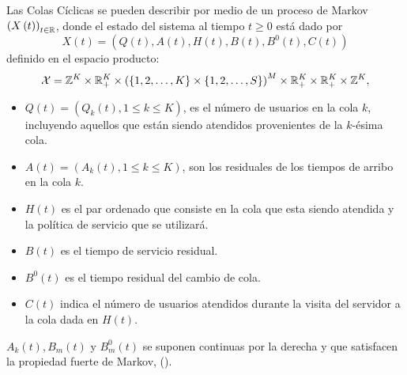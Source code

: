 Las Colas C\'iclicas se pueden describir por medio de un proceso
de Markov $\left(X\left(t\right)\right)_{t\in\mathbb{R}}$, donde el
estado del sistema al tiempo $t\geq0$ est\'a dado por
\begin{equation}
X\left(t\right)=\left(Q\left(t\right),A\left(t\right),H\left(t\right),B\left(t\right),B^{0}\left(t\right),C\left(t\right)\right)
\end{equation}
definido en el espacio producto:
\begin{equation}
\mathcal{X}=\mathbb{Z}^{K}\times\mathbb{R}_{+}^{K}\times\left(\left\{1,2,\ldots,K\right\}\times\left\{1,2,\ldots,S\right\}\right)^{M}\times\mathbb{R}_{+}^{K}\times\mathbb{R}_{+}^{K}\times\mathbb{Z}^{K},
\end{equation}

\begin{itemize}
\item $Q\left(t\right)=\left(Q_{k}\left(t\right),1\leq k\leq
K\right)$, es el n\'umero de usuarios en la cola $k$, incluyendo
aquellos que est\'an siendo atendidos provenientes de la
$k$-\'esima cola.

\item $A\left(t\right)=\left(A_{k}\left(t\right),1\leq k\leq
K\right)$, son los residuales de los tiempos de arribo en la cola
$k$. \item $H\left(t\right)$ es el par ordenado que consiste en la
cola que esta siendo atendida y la pol\'itica de servicio que se
utilizar\'a.

\item $B\left(t\right)$ es el tiempo de servicio residual.

\item $B^{0}\left(t\right)$ es el tiempo residual del cambio de
cola.

\item $C\left(t\right)$ indica el n\'umero de usuarios atendidos
durante la visita del servidor a la cola dada en
$H\left(t\right)$.
\end{itemize}

$A_{k}\left(t\right),B_{m}\left(t\right)$ y
$B_{m}^{0}\left(t\right)$ se suponen continuas por la derecha y
que satisfacen la propiedad fuerte de Markov, (\cite{Dai}).

